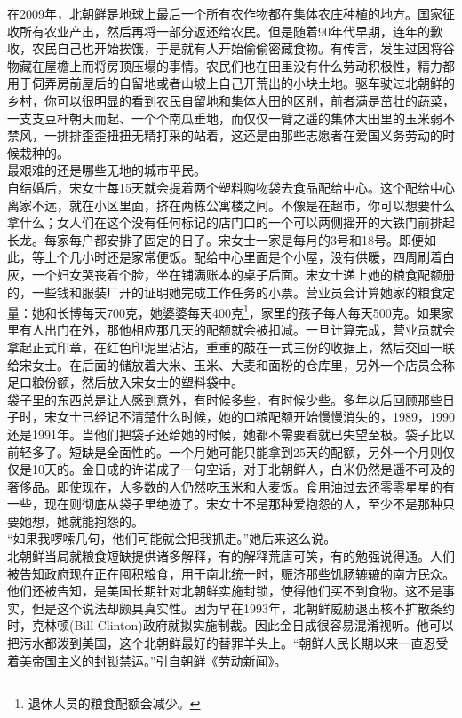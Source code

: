 \begin{multicols}{\theparacolNo}
在2009年，北朝鲜是地球上最后一个所有农作物都在集体农庄种植的地方。国家征收所有农业产出，然后再将一部分返还给农民。但是随着90年代早期，连年的歉收，农民自己也开始挨饿，于是就有人开始偷偷密藏食物。有传言，发生过因将谷物藏在屋檐上而将房顶压塌的事情。农民们也在田里没有什么劳动积极性，精力都用于伺弄房前屋后的自留地或者山坡上自己开荒出的小块土地。驱车驶过北朝鲜的乡村，你可以很明显的看到农民自留地和集体大田的区别，前者满是茁壮的蔬菜，一支支豆杆朝天而起、一个个南瓜垂地，而仅仅一臂之遥的集体大田里的玉米弱不禁风，一排排歪歪扭扭无精打采的站着，这还是由那些志愿者在爱国义务劳动的时候栽种的。\\

最艰难的还是哪些无地的城市平民。\\

自结婚后，宋女士每15天就会提着两个塑料购物袋去食品配给中心。这个配给中心离家不远，就在小区里面，挤在两栋公寓楼之间。不像是在超市，你可以想要什么拿什么；女人们在这个没有任何标记的店门口的一个可以两侧摇开的大铁门前排起长龙。每家每户都安排了固定的日子。宋女士一家是每月的3号和18号。即便如此，等上个几小时还是家常便饭。配给中心里面是个小屋，没有供暖，四周刷着白灰，一个妇女哭丧着个脸，坐在铺满账本的桌子后面。宋女士递上她的粮食配额册的，一些钱和服装厂开的证明她完成工作任务的小票。营业员会计算她家的粮食定量：她和长博每天700克，她婆婆每天400克\footnote{退休人员的粮食配额会减少。}，家里的孩子每人每天500克。如果家里有人出门在外，那他相应那几天的配额就会被扣减。一旦计算完成，营业员就会拿起正式印章，在红色印泥里沾沾，重重的敲在一式三份的收据上，然后交回一联给宋女士。在后面的储放着大米、玉米、大麦和面粉的仓库里，另外一个店员会称足口粮份额，然后放入宋女士的塑料袋中。\\

袋子里的东西总是让人感到意外，有时候多些，有时候少些。多年以后回顾那些日子时，宋女士已经记不清楚什么时候，她的口粮配额开始慢慢消失的，1989，1990还是1991年。当他们把袋子还给她的时候，她都不需要看就已失望至极。袋子比以前轻多了。短缺是全面性的。一个月她可能只能拿到25天的配额，另外一个月则仅仅是10天的。金日成的许诺成了一句空话，对于北朝鲜人，白米仍然是遥不可及的奢侈品。即使现在，大多数的人仍然吃玉米和大麦饭。食用油过去还零零星星的有一些，现在则彻底从袋子里绝迹了。宋女士不是那种爱抱怨的人，至少不是那种只要她想，她就能抱怨的。\\

“如果我啰嗦几句，他们可能就会把我抓走。”她后来这么说。\\

北朝鲜当局就粮食短缺提供诸多解释，有的解释荒唐可笑，有的勉强说得通。人们被告知政府现在正在囤积粮食，用于南北统一时，赈济那些饥肠辘辘的南方民众。他们还被告知，是美国长期针对北朝鲜实施封锁，使得他们买不到食物。这不是事实，但是这个说法却颇具真实性。因为早在1993年，北朝鲜威胁退出核不扩散条约时，克林顿(Bill Clinton)政府就拟实施制裁。因此金日成很容易混淆视听。他可以把污水都泼到美国，这个北朝鲜最好的替罪羊头上。“朝鲜人民长期以来一直忍受着美帝国主义的封锁禁运。”引自朝鲜《劳动新闻》。\\


\end{multicols}
